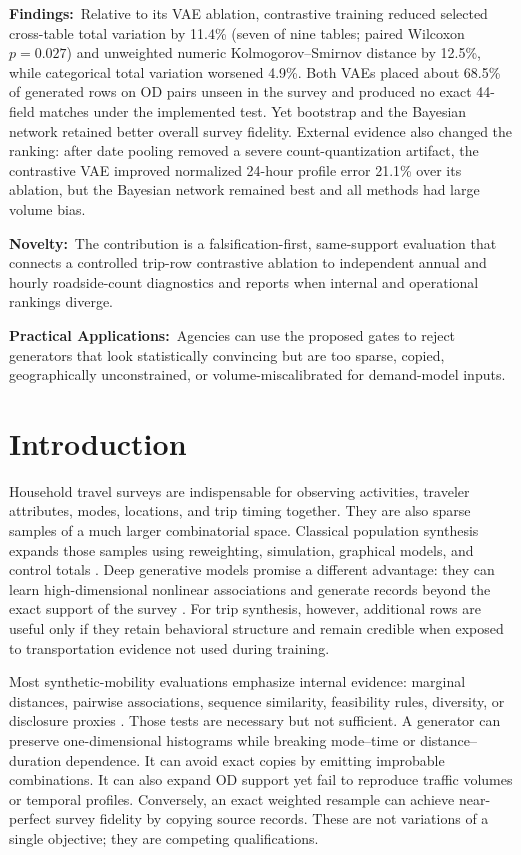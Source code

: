 \documentclass[numbered]{trbunofficial}
\begin{document}
\hfill\break%
\noindent\textbf{Findings:}~Relative to its VAE ablation, contrastive training reduced selected cross-table total variation by 11.4\% (seven of nine tables; paired Wilcoxon $p=0.027$) and unweighted numeric Kolmogorov--Smirnov distance by 12.5\%, while categorical total variation worsened 4.9\%. Both VAEs placed about 68.5\% of generated rows on OD pairs unseen in the survey and produced no exact 44-field matches under the implemented test. Yet bootstrap and the Bayesian network retained better overall survey fidelity. External evidence also changed the ranking: after date pooling removed a severe count-quantization artifact, the contrastive VAE improved normalized 24-hour profile error 21.1\% over its ablation, but the Bayesian network remained best and all methods had large volume bias.

\hfill\break%
\noindent\textbf{Novelty:}~The contribution is a falsification-first, same-support evaluation that connects a controlled trip-row contrastive ablation to independent annual and hourly roadside-count diagnostics and reports when internal and operational rankings diverge.

\hfill\break%
\noindent\textbf{Practical Applications:}~Agencies can use the proposed gates to reject generators that look statistically convincing but are too sparse, copied, geographically unconstrained, or volume-miscalibrated for demand-model inputs.

\newpage

\section{Introduction}

Household travel surveys are indispensable for observing activities, traveler attributes, modes, locations, and trip timing together. They are also sparse samples of a much larger combinatorial space. Classical population synthesis expands those samples using reweighting, simulation, graphical models, and control totals \cite{beckman1996creating,farooq2013simulation,sun2015bayesian}. Deep generative models promise a different advantage: they can learn high-dimensional nonlinear associations and generate records beyond the exact support of the survey \cite{borysov2019microagents,garrido2020rare,kim2023feasible}. For trip synthesis, however, additional rows are useful only if they retain behavioral structure and remain credible when exposed to transportation evidence not used during training.

Most synthetic-mobility evaluations emphasize internal evidence: marginal distances, pairwise associations, sequence similarity, feasibility rules, diversity, or disclosure proxies \cite{kapp2024review,choi2025tutorial,wu2026evaluation}. Those tests are necessary but not sufficient. A generator can preserve one-dimensional histograms while breaking mode--time or distance--duration dependence. It can avoid exact copies by emitting improbable combinations. It can also expand OD support yet fail to reproduce traffic volumes or temporal profiles. Conversely, an exact weighted resample can achieve near-perfect survey fidelity by copying source records. These are not variations of a single objective; they are competing qualifications.
\end{document}
